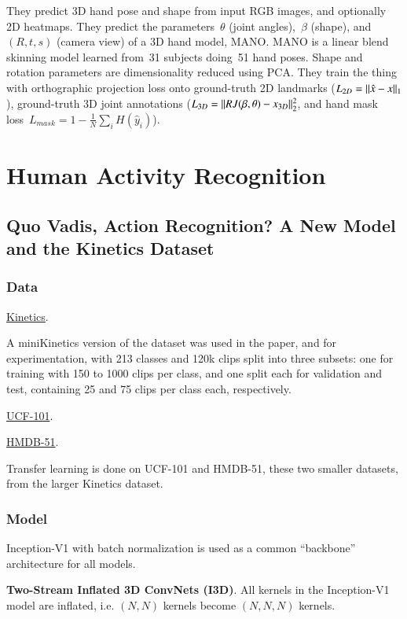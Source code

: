 \documentclass[a4paper, 12pt]{article}
\DeclarePairedDelimiter\norm{\lVert}{\rVert}%
\begin{document}
They predict 3D hand pose and shape from input RGB images, and optionally 2D
heatmaps.
They predict the parameters~$\theta$ (joint angles),~$\beta$ (shape),
and~$(R, t, s)$ (camera view) of a 3D hand model, MANO\@.
MANO is a linear blend skinning model learned from~\num{31} subjects
doing~\num{51} hand poses.
Shape and rotation parameters are dimensionality reduced using PCA\@.
They train the thing with orthographic projection loss onto ground-truth 2D
landmarks ($L_{2D} = \norm{\hat{x} - x}_1$), ground-truth 3D joint annotations
($L_{3D} = \norm{RJ(\beta, \theta) - x_{3D}}^2_2$, and hand mask
loss~$L_{mask} = 1 - \frac{1}{N}\sum_i H(\hat{y}_i)$).


\section{Human Activity Recognition}


\subsection{Quo Vadis, Action Recognition? A New Model and the Kinetics
            Dataset\citet{carreira2017quo}}

\subsubsection{Data}

\hyperref[kinetics]{Kinetics}.

A miniKinetics version of the dataset was used in the paper, and for
experimentation, with 213 classes and 120k clips split into three subsets: one
for training with 150 to 1000 clips per class, and one split each for
validation and test, containing 25 and 75 clips per class each, respectively.

\hyperref[ucf101]{UCF-101}.

\hyperref[hmdb51]{HMDB-51}.

Transfer learning is done on UCF-101 and HMDB-51, these two smaller datasets,
from the larger Kinetics dataset.

\subsubsection{Model}

Inception-V1 with batch normalization is used as a common ``backbone''
architecture for all models.

\textbf{Two-Stream Inflated 3D ConvNets (I3D)}. All kernels in the Inception-V1
model are inflated, i.e. $(N, N)$ kernels become $(N, N, N)$ kernels.
\end{document}

